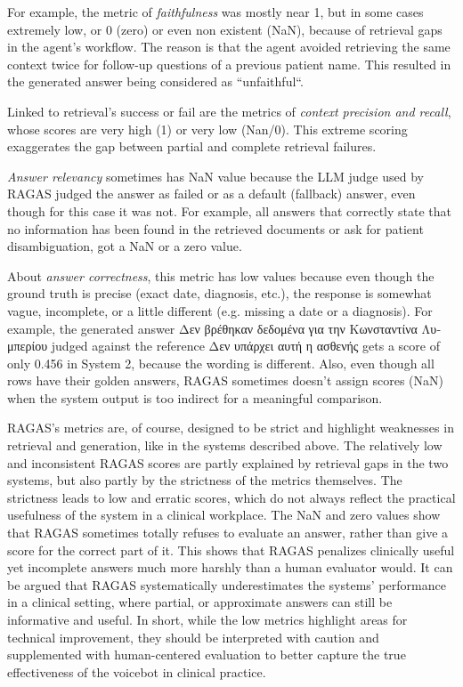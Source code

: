 For example, the metric of \textit{faithfulness} was mostly near 1, but in some cases extremely low, or 0 (zero) or even non existent (NaN), because of retrieval gaps in the agent's workflow. The reason is that the agent avoided retrieving the same context twice for follow-up questions of a previous patient name. This resulted in the generated answer being considered as ``unfaithful``.

Linked to retrieval's success or fail are the metrics of \textit{context precision and recall}, whose scores are very high (1) or very low (Nan/0). This extreme scoring exaggerates the gap between partial and complete retrieval failures.

\textit{Answer relevancy} sometimes has NaN value because the LLM judge used by RAGAS judged the answer as failed or as a default (fallback) answer, even though for this case it was not. For example, all answers that correctly state that no information has been found in the retrieved documents or ask for patient disambiguation, got a NaN or a zero value.

About \textit{answer correctness}, this metric has low values because even though the ground truth is precise (exact date, diagnosis, etc.), the response is somewhat vague, incomplete, or a little different (e.g. missing a date or a diagnosis). For example, the generated answer \textgreek{Δεν βρέθηκαν δεδομένα για την Κωνσταντίνα Λυμπερίου} judged against the reference \textgreek{Δεν υπάρχει αυτή η ασθενής} gets a score of only 0.456 in System 2, because the wording is different. Also, even though all rows have their golden answers, RAGAS sometimes doesn’t assign scores (NaN) when the system output is too indirect for a meaningful comparison.

RAGAS's metrics are, of course, designed to be strict and highlight weaknesses in retrieval and generation, like in the systems described above. The relatively low and inconsistent RAGAS scores are partly explained by retrieval gaps in the two systems, but also partly by the strictness of the metrics themselves. The strictness leads to low and erratic scores, which do not always reflect the practical usefulness of the system in a clinical workplace. The NaN and zero values show that RAGAS sometimes totally refuses to evaluate an answer, rather than give a score for the correct part of it. This shows that RAGAS penalizes clinically useful yet incomplete answers much more harshly than a human evaluator would. It can be argued that RAGAS systematically underestimates the systems' performance in a clinical setting, where partial, or approximate answers can still be informative and useful. In short, while the low metrics highlight areas for technical improvement, they should be interpreted with caution and supplemented with human-centered evaluation to better capture the true effectiveness of the voicebot in clinical practice.


